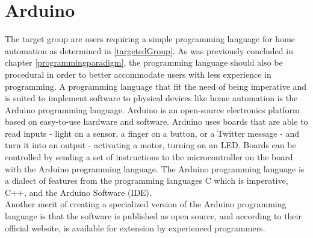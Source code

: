\section{Arduino}
The target group are users requiring a simple programming language for home automation as determined in \ref{targetedGroup}. As was previously concluded in chapter \ref{programmingparadigm}, the programming language should also be procedural in order to better accommodate users with less experience in programming. 
A programming language that fit the need of being imperative and is suited to implement software to physical devices like home automation is the Arduino programming language. Arduino is an open-source electronics platform based on easy-to-use hardware and software. Arduino uses boards that are able to read inputs - light on a sensor, a finger on a button, or a Twitter message - and turn it into an output - activating a motor, turning on an LED. Boards can be controlled by sending a set of instructions to the microcontroller on the board with the Arduino programming language. The Arduino programming language is a dialect of features from the programming languages C which is imperative, C++, and the Arduino Software (IDE)\cite{audionocc}. \\ 


Another merit of creating a specialized version of the Arduino programming language is that the software is published as open source, and according to their official website, is available for extension by experienced programmers\cite{audionocc}.








